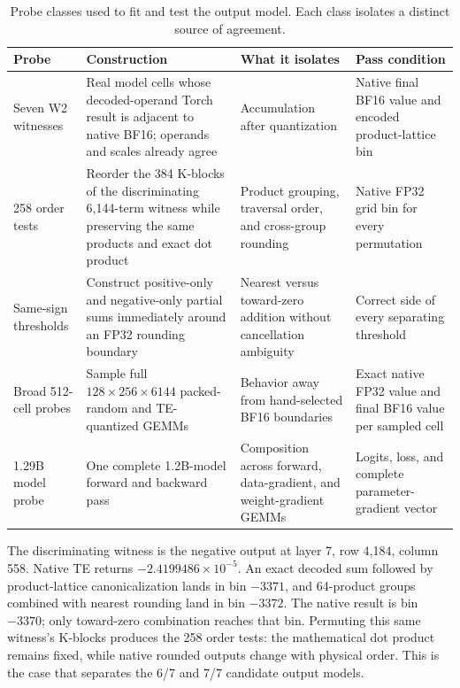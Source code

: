 \documentclass[11pt]{article}
\begin{document}
\begin{table}[H]
  \centering
  \scriptsize
  \caption{Probe classes used to fit and test the output model.  Each class
  isolates a distinct source of agreement.}
  \label{tab:gemm-probes}
  \begin{tabularx}{\textwidth}{@{}p{}p{}YY@{}}
    \toprule
    Probe & Construction & What it isolates & Pass condition \\
    \midrule
    Seven W2 witnesses
      & Real model cells whose decoded-operand Torch result is adjacent to native
        BF16; operands and scales already agree
      & Accumulation after quantization
      & Native final BF16 value and encoded product-lattice bin \\
    258 order tests
      & Reorder the 384 K-blocks of the discriminating 6,144-term witness while
        preserving the same products and exact dot product
      & Product grouping, traversal order, and cross-group rounding
      & Native FP32 grid bin for every permutation \\
    Same-sign thresholds
      & Construct positive-only and negative-only partial sums immediately
        around an FP32 rounding boundary
      & Nearest versus toward-zero addition without cancellation ambiguity
      & Correct side of every separating threshold \\
    Broad 512-cell probes
      & Sample full $128\mathbin{\times}256\mathbin{\times}6144$ packed-random
        and TE-quantized GEMMs
      & Behavior away from hand-selected BF16 boundaries
      & Exact native FP32 value and final BF16 value per sampled cell \\
    1.29B model probe
      & One complete 1.2B-model forward and backward pass
      & Composition across forward, data-gradient, and weight-gradient GEMMs
      & Logits, loss, and complete parameter-gradient vector \\
    \bottomrule
  \end{tabularx}
\end{table}

The discriminating witness is the negative output at layer 7, row 4,184,
column 558.
Native TE returns $-2.4199486\times10^{-5}$.  An exact decoded sum followed by
product-lattice canonicalization lands in bin $-3371$, and 64-product groups combined
with nearest rounding land in bin $-3372$.  The native result is bin $-3370$;
only toward-zero combination reaches that bin.  Permuting this same witness's
K-blocks produces the 258 order tests: the mathematical dot product remains
fixed, while native rounded outputs change with physical order.  This is the
case that separates the 6/7 and 7/7 candidate output models.
\end{document}
